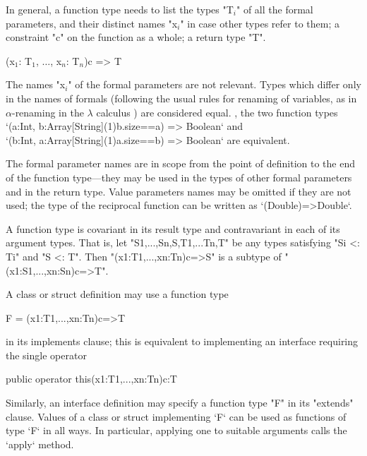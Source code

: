 In general, a function type needs to list the types 
\xcdmath"T$_i$"
of all the formal parameters,
and their distinct names \xcdmath"x$_i$" in case other types refer to them; a
constraint 
\xcd"c" on the
function as a whole; a return type \xcd"T".

\begin{xtenmath}
(x$_1$: T$_1$, $\dots$, x$_n$: T$_n$){c} => T
\end{xtenmath}

The names \xcdmath"x$_i$" of the formal parameters are not relevant.  Types
which differ only in the names of formals (following the usual rules for
renaming of variables, as in {$\alpha$}-renaming in the {$\lambda$} calculus
) are considered equal.  \Eg, the two function types
\xcd`(a:Int, b:Array[String](1){b.size==a}) => Boolean`
and \\
\xcd`(b:Int, a:Array[String](1){a.size==b}) => Boolean`
are equivalent.


The formal parameter names are in scope from the point of definition to the
end of the function type---they may be used in the types of other formal parameters
and in the return type. 
Value parameters names may be
omitted if they are not used; the type of the reciprocal function can be
written as
\xcd`(Double)=>Double`. 

A function type is covariant in its result type and contravariant in
each of its argument types. That is, let 
\xcd"S1,...,Sn,S,T1,...Tn,T" be any
types satisfying \xcd"Si <: Ti" and \xcd"S <: T". Then
\xcd"(x1:T1,...,xn:Tn){c}=>S" is a subtype of
\xcd"(x1:S1,...,xn:Sn){c}=>T".

A class or struct definition may use a function type 
\begin{xtenmath}
F = (x1:T1,...,xn:Tn){c}=>T
\end{xtenmath}
in its 
implements clause; 
this is equivalent to implementing an interface requiring the single operator
\begin{xtenmath}
public operator this(x1:T1,...,xn:Tn){c}:T
\end{xtenmath}
Similarly, an interface
definition may specify a function type \xcd"F" in its \xcd"extends" clause.
Values of a class or struct implementing \xcd`F` 
can be used as functions of type \xcd`F` in all ways.  
In particular, applying one to suitable arguments calls the \xcd`apply`
method. 


